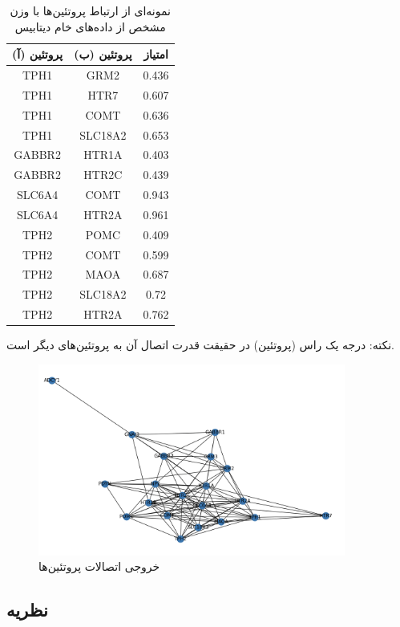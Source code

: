 \documentclass[10pt, a4paper]{article}
\begin{document}
\begin{LTR}
    \begin{table}[H]
        \centering
        \begin{RTL}
            \caption{نمونه‌ای از ارتباط پروتئین‌ها با وزن مشخص از داده‌های خام
            دیتابیس }
        \end{RTL}
        \begin{tabular}{cc|c}
            پروتئین (آ) & پروتئین (ب) & امتیاز \\ \hline
            TPH1 & GRM2 & 0.436 \\ \hline  
            TPH1 & HTR7 & 0.607 \\ \hline
            TPH1 & COMT & 0.636 \\ \hline
            TPH1 & SLC18A2 & 0.653 \\ \hline
            GABBR2 & HTR1A & 0.403 \\ \hline
            GABBR2 & HTR2C & 0.439 \\ \hline
            SLC6A4 & COMT & 0.943 \\ \hline
            SLC6A4 & HTR2A & 0.961 \\ \hline
            TPH2 & POMC & 0.409 \\ \hline
            TPH2 & COMT & 0.599 \\ \hline
            TPH2 & MAOA & 0.687 \\ \hline
            TPH2 & SLC18A2 & 0.72 \\ \hline
            TPH2 & HTR2A & 0.762 \\ 
        \end{tabular}
    \end{table}
\end{LTR}

نکته: درجه یک راس (پروتئین) در حقیقت قدرت اتصال آن به پروتئین‌های دیگر است.

\begin{figure}[H]
    \centering
    \includegraphics[width=0.9\textwidth]{images/exported_graph.png}
    \caption{خروجی اتصالات پروتئین‌ها}
    \label{fig: exportedGraph}
\end{figure}

\subsection{نظریه  \cite{enwiki:1193904520}}

\newpage


\end{document}
